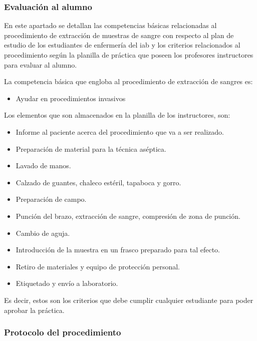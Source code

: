 \subsubsection{Evaluación al alumno}


En este apartado se detallan las competencias básicas relacionadas al procedimiento
de extracción de muestras de sangre con respecto al plan de estudio de los estudiantes 
de enfermería del \Gls{iab} y los criterios relacionados al procedimiento según la planilla de
práctica que poseen los profesores instructores para evaluar al alumno.

La competencia básica que engloba al procedimiento de extracción de sangres es:

\begin{itemize}
\item Ayudar en procedimientos invasivos
\end{itemize}

Los elementos que son almacenados en la planilla de los instructores, son:


\begin{itemize}
\item Informe al paciente acerca del procedimiento que va a ser
    realizado.
\item Preparación de material para la técnica aséptica.
\item Lavado de manos.
\item Calzado de guantes, chaleco estéril, tapaboca y gorro.
\item Preparación de campo.
\item Punción del brazo, extracción de sangre, compresión de zona de punción.
\item Cambio de aguja.
\item Introducción de la muestra en un frasco preparado para tal efecto.
\item Retiro de materiales y equipo de protección personal.
\item Etiquetado y envío a laboratorio.
\end{itemize}

Es decir, estos son los criterios que debe cumplir cualquier estudiante
para poder aprobar la práctica.

\subsubsection{Protocolo del procedimiento}
\label{sec:hemocultivo_protocolo}

